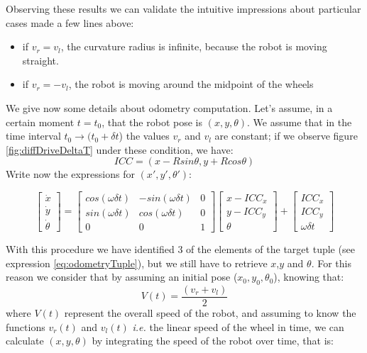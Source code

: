 Observing these results we can validate the intuitive impressions about particular cases made a few lines above:
\begin{itemize}
	\item if $v_r=v_l$, the curvature radius is infinite, because the robot is moving straight.
	\item if $v_r=-v_l$, the robot is moving around the midpoint of the wheels
\end{itemize}
We give now some details about odometry computation. Let's assume, in a certain moment $t=t_0$, that the robot pose is $(x,y,\theta)$. We assume that in the time interval $t_0\rightarrow (t_0 +\delta t$) the values $v_r$ and $v_l$ are constant; if we observe figure \ref{fig:diffDriveDeltaT} under these condition, we have:
\begin{equation}
	ICC=(x-Rsin\theta, y+Rcos\theta)
\end{equation}
Write now the expressions for $(x',y',\theta')$:

\[
\begin{bmatrix}
\dot{x} \\
\dot{y} \\
\dot{\theta}
\end{bmatrix}
 = 
\begin{bmatrix}
cos(\omega \delta t) & -sin(\omega \delta t) & 0 \\
sin(\omega \delta t)  & cos(\omega \delta t) & 0 \\
0                                       & 0                                      & 1
\end{bmatrix}
\begin{bmatrix}
x-ICC_x\\
y-ICC _y\\
\theta
\end{bmatrix}
+
\begin{bmatrix}
ICC_x \\
ICC_y \\
\omega \delta t
\end{bmatrix}
\]

With this procedure we have identified 3 of the elements of the target tuple (see expression \ref{eq:odometryTuple}), but we still have to retrieve $x$,$y$ and $\theta$. For this reason we consider that by assuming an initial pose ($x_0, y_0, \theta_0$), knowing that:
\begin{equation}
	V(t)=\frac{(v_r+v_l)}{2}
\end{equation}
where $V(t)$ represent the overall speed of the robot, and assuming to know the functions $v_r(t)$ and $v_l(t)$ \textit{i.e.} the linear speed of the wheel in time, we can calculate $(x,y,\theta)$ by integrating the speed of the robot over time, that is:

